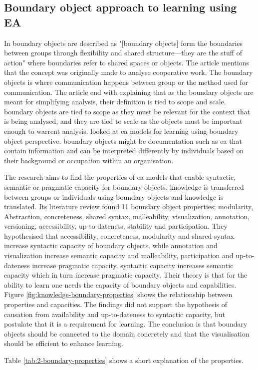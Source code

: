 \subsection{Boundary object approach to learning using EA}
In \cite{doi:10.1177/0162243910377624} \glspl{boundary object} are described as "[\glspl{boundary object}] form the boundaries between groups through flexibility and shared structure—they are the stuff of action" \cite[p.~603]{doi:10.1177/0162243910377624} where boundaries refer to shared spaces or objects. The article mentions that the concept was originally made to analyse cooperative work. The \glspl{boundary object} is where communication happens between group or the method used for communication. The article end with explaining that as the \glspl{boundary object} are meant for simplifying analysis, their definition is tied to scope and scale. \glspl{boundary object} are tied to scope as they must be relevant for the context that is being analysed, and they are tied to scale as the objects must be important enough to warrent analysis.
\cite{abraham2015crossing} looked at \gls{ea} models for learning using \gls{boundary object} perspective. \glspl{boundary object} might be documentation such as \gls{ea} that contain information and can be interpreted differently by individuals based on their background or occupation within an organisation.

The research aims to find the properties of \gls{ea} models that enable syntactic, semantic or pragmatic capacity for \glspl{boundary object}. knowledge is transferred between groups or individuals using \glspl{boundary object} and knowledge is translated. Its literature review found 11 boundary object properties;  modularity, Abstraction, concreteness, shared syntax, malleability, visualization, annotation, versioning, accessibility, up-to-dateness, stability and participation. They hypothesised that accessibility, concreteness, modularity and shared syntax increase syntactic capacity of \glspl{boundary object}. while annotation and visualization increase semantic capacity and malleability, participation and up-to-dateness increase pragmatic capacity. syntactic capacity increases semantic capacity which in turn increase pragmatic capacity. Their theory is that for the ability to learn one needs the capacity of \glspl{boundary object} and capabilities. Figure \ref{fig:knowledge-boundary-properties} shows the relationship between properties and capacities. The findings did not support the hypothesis of causation from availability and up-to-dateness to syntactic capacity, but postulate  that it is a requirement for learning. The conclusion is that \glspl{boundary object} should be connected to the domain concretely and that the visualisation should be efficient to enhance learning. 

Table \ref{tab:2-boundary-properties} shows a short explanation of the properties.

